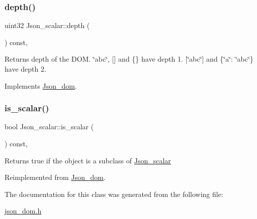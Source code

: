 \subsubsection{\texorpdfstring{depth()}{depth()}}
{\footnotesize\ttfamily uint32 Json\+\_\+scalar\+::depth (\begin{DoxyParamCaption}{ }\end{DoxyParamCaption}) const\hspace{0.3cm}{\ttfamily [inline]}, {\ttfamily [virtual]}}

\begin{DoxyReturn}{Returns}
depth of the D\+OM. \char`\"{}abc\char`\"{}, \mbox{[}\mbox{]} and \{\} have depth 1. \mbox{[}\char`\"{}abc\char`\"{}\mbox{]} and \{\char`\"{}a\char`\"{}\+: \char`\"{}abc\char`\"{}\} have depth 2. 
\end{DoxyReturn}


Implements \mbox{\hyperlink{classJson__dom_a779b8c6ac78329409f8be12e6d082782}{Json\+\_\+dom}}.

\mbox{\label{classJson__scalar_a521c56a686010b1d60f612d1c376aa85}} 
\subsubsection{\texorpdfstring{is\+\_\+scalar()}{is\_scalar()}}
{\footnotesize\ttfamily bool Json\+\_\+scalar\+::is\+\_\+scalar (\begin{DoxyParamCaption}{ }\end{DoxyParamCaption}) const\hspace{0.3cm}{\ttfamily [inline]}, {\ttfamily [virtual]}}

\begin{DoxyReturn}{Returns}
true if the object is a subclass of \mbox{\hyperlink{classJson__scalar}{Json\+\_\+scalar}} 
\end{DoxyReturn}


Reimplemented from \mbox{\hyperlink{classJson__dom_a0288197126a1427a5f88fa8b94d6de3d}{Json\+\_\+dom}}.



The documentation for this class was generated from the following file\+:\begin{DoxyCompactItemize}
\item 
\mbox{\hyperlink{json__dom_8h}{json\+\_\+dom.\+h}}\end{DoxyCompactItemize}
